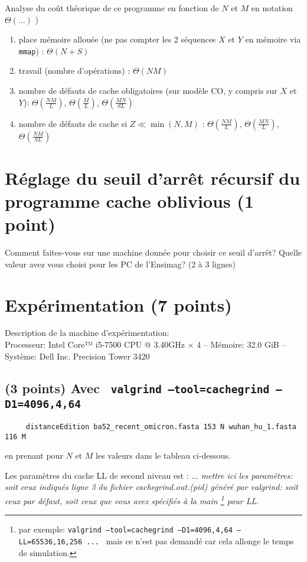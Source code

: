\documentclass[10pt,a4paper]{article}
\begin{document}
\medskip

Analyse du coût théorique de ce  programme en fonction de $N$ et $M$  en notation $\Theta(...)$ )
\begin{enumerate}
  \item place mémoire allouée (ne pas compter les 2 séquences $X$ et $Y$ en mémoire via {\tt mmap}) : $\Theta(N + S)$
  \item travail (nombre d'opérations) : $\Theta(NM)$
  \item nombre de défauts de cache obligatoires (sur modèle CO, y compris sur $X$ et $Y$): $\Theta \left( \frac{NM}{L} \right)$, $\Theta \left( \frac{M}{L} \right)$, $\Theta \left( \frac{MN}{SL} \right)$
  \item nombre de défauts de cache si $Z \ll \min(N,M)$ : $\Theta \left( \frac{NM}{L} \right)$, $\Theta \left( \frac{MN}{L} \right)$, $\Theta \left( \frac{NM}{SL} \right)$
\end{enumerate}

\section{Réglage du seuil d'arrêt récursif du programme cache oblivious  (1 point)} 
Comment faites-vous sur une machine donnée pour choisir ce seuil d'arrêt? Quelle valeur avez vous choisi pour les
PC de l'Ensimag? (2 à 3 lignes) 

\section{Expérimentation (7 points)}

Description de la machine d'expérimentation:  \\
Processeur: Intel Core™ i5-7500 CPU @ 3.40GHz × 4 --
Mémoire: 32.0 GiB --
Système: Dell Inc. Precision Tower 3420

\subsection{(3 points) Avec {\tt 
	valgrind --tool=cachegrind --D1=4096,4,64
}} 
\begin{verbatim}
     distanceEdition ba52_recent_omicron.fasta 153 N wuhan_hu_1.fasta 116 M 
\end{verbatim}
en prenant pour $N$ et $M$ les valeurs dans le tableau ci-dessous.


Les paramètres du cache LL de second niveau est : ...
{\em mettre ici les paramètres: soit ceux indiqués ligne 3
du fichier cachegrind.out.(pid) généré par valgrind: soit ceux par défaut,
soit ceux que vous avez spécifiés à la main
\footnote{par exemple:
{\tt valgrind --tool=cachegrind --D1=4096,4,64 --LL=65536,16,256  ... }
mais ce n'est pas demandé car cela allonge le temps de simulation. } 
 pour LL. }
\end{document}
